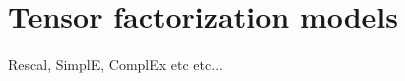 

\section{Tensor factorization models}\label{sec:emb-tensors}
Rescal, SimplE, ComplEx etc etc...




